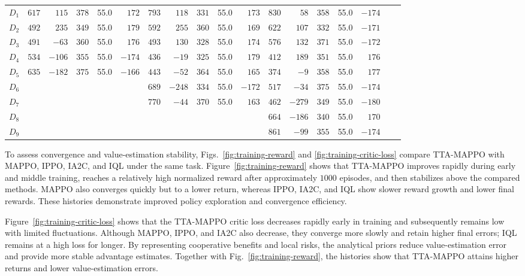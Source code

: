 \documentclass{cja}
\begin{document}
\begin{table}[!t]
{\begin{tabular}{@{}c rrrrr rrrrr rrrrr cc@{}}
$D_1$ & $617$ & $115$ & $378$ & 55.0 & $172$ & $793$ & $118$ & $331$ & 55.0 & $173$ & $830$ & $58$ & $358$ & 55.0 & $-174$ &&\\
$D_2$ & $492$ & $235$ & $349$ & 55.0 & $179$ & $592$ & $255$ & $360$ & 55.0 & $169$ & $622$ & $107$ & $332$ & 55.0 & $-171$ &&\\
$D_3$ & $491$ & $-63$ & $360$ & 55.0 & $176$ & $493$ & $130$ & $328$ & 55.0 & $174$ & $576$ & $132$ & $371$ & 55.0 & $-172$ &&\\
$D_4$ & $534$ & $-106$ & $355$ & 55.0 & $-174$ & $436$ & $-19$ & $325$ & 55.0 & $179$ & $412$ & $189$ & $351$ & 55.0 & $176$ &&\\
$D_5$ & $635$ & $-182$ & $375$ & 55.0 & $-166$ & $443$ & $-52$ & $364$ & 55.0 & $165$ & $374$ & $-9$ & $358$ & 55.0 & $177$ &&\\
$D_6$ & & & & & & $689$ & $-248$ & $334$ & 55.0 & $-172$ & $517$ & $-34$ & $375$ & 55.0 & $-174$ &&\\
$D_7$ & & & & & & $770$ & $-44$ & $370$ & 55.0 & $163$ & $462$ & $-279$ & $349$ & 55.0 & $-180$ &&\\
$D_8$ & & & & & & & & & & & $664$ & $-186$ & $340$ & 55.0 & $170$ &&\\
$D_9$ & & & & & & & & & & & $861$ & $-99$ & $355$ & 55.0 & $-174$ &&\\
\bottomrule
\end{tabular}%
}
\end{table}

To assess convergence and value-estimation stability, Figs.~\ref{fig:training-reward} and \ref{fig:training-critic-loss} compare TTA-MAPPO with MAPPO, IPPO, IA2C, and IQL under the same task. Figure~\ref{fig:training-reward} shows that TTA-MAPPO improves rapidly during early and middle training, reaches a relatively high normalized reward after approximately $1000$ episodes, and then stabilizes above the compared methods. MAPPO also converges quickly but to a lower return, whereas IPPO, IA2C, and IQL show slower reward growth and lower final rewards. These histories demonstrate improved policy exploration and convergence efficiency.

Figure~\ref{fig:training-critic-loss} shows that the TTA-MAPPO critic loss decreases rapidly early in training and subsequently remains low with limited fluctuations. Although MAPPO, IPPO, and IA2C also decrease, they converge more slowly and retain higher final errors; IQL remains at a high loss for longer. By representing cooperative benefits and local risks, the analytical priors reduce value-estimation error and provide more stable advantage estimates. Together with Fig.~\ref{fig:training-reward}, the histories show that TTA-MAPPO attains higher returns and lower value-estimation errors.
\end{document}
